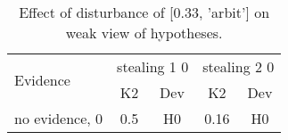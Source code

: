 \begin{table}\begin{tabular}{l|cc|cc}\toprule\multirow{2}{*}{Evidence} & \multicolumn{2}{c}{stealing 1 0}& \multicolumn{2}{c}{stealing 2 0}\\& {K2} & {Dev}& {K2} & {Dev}\\\midrule
no evidence, 0 & \cellcolor{Bittersweet}0.5&\cellcolor{Bittersweet}H0&\cellcolor{Bittersweet}0.16&\cellcolor{Bittersweet}H0\\\bottomrule\end{tabular}\caption{Effect of disturbance of [0.33, 'arbit'] on weak view of hypotheses.}\end{table}